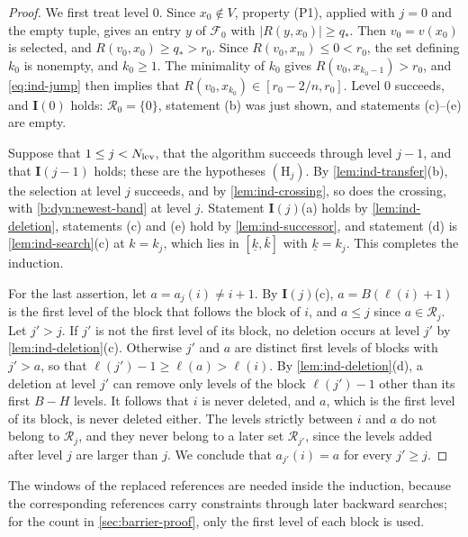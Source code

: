 \begin{proof}
We first treat level $0$. Since $x_0\notin V$, property (P1), applied with $j=0$ and the empty tuple, gives an entry $y$ of $\mathcal F_0$ with $|R(y,x_0)|\ge q_*$. Then $v_0=v(x_0)$ is selected, and $R(v_0,x_0)\ge q_*>r_0$. Since $R(v_0,x_m)\le0<r_0$, the set defining $k_0$ is nonempty, and $k_0\ge1$. The minimality of $k_0$ gives $R(v_0,x_{k_0-1})>r_0$, and \eqref{eq:ind-jump} then implies that $R(v_0,x_{k_0})\in[r_0-2/n,r_0]$. Level $0$ succeeds, and $\mathbf I(0)$ holds: $\mathcal R_0=\{0\}$, statement (b) was just shown, and statements (c)--(e) are empty.

Suppose that $1\le j<N_{\rm lev}$, that the algorithm succeeds through level $j-1$, and that $\mathbf I(j-1)$ holds; these are the hypotheses $(\mathrm H_j)$. By \cref{lem:ind-transfer}(b), the selection at level $j$ succeeds, and by \cref{lem:ind-crossing}, so does the crossing, with \eqref{b:dyn:newest-band} at level $j$. Statement $\mathbf I(j)$(a) holds by \cref{lem:ind-deletion}, statements (c) and (e) hold by \cref{lem:ind-successor}, and statement (d) is \cref{lem:ind-search}(c) at $k=k_j$, which lies in $[\underline k,{\bar k}]$ with $\underline k=k_j$. This completes the induction.

For the last assertion, let $a=a_j(i)\neq i+1$. By $\mathbf I(j)$(c), $a=B({\ell}(i)+1)$ is the first level of the block that follows the block of $i$, and $a\le j$ since $a\in\mathcal R_j$. Let $j'>j$. If $j'$ is not the first level of its block, no deletion occurs at level $j'$ by \cref{lem:ind-deletion}(c). Otherwise $j'$ and $a$ are distinct first levels of blocks with $j'>a$, so that ${\ell}(j')-1\ge {\ell}(a)>{\ell}(i)$. By \cref{lem:ind-deletion}(d), a deletion at level $j'$ can remove only levels of the block ${\ell}(j')-1$ other than its first $B-H$ levels. It follows that $i$ is never deleted, and $a$, which is the first level of its block, is never deleted either. The levels strictly between $i$ and $a$ do not belong to $\mathcal R_j$, and they never belong to a later set $\mathcal R_{j'}$, since the levels added after level $j$ are larger than $j$. We conclude that $a_{j'}(i)=a$ for every $j'\ge j$.
\end{proof}

The windows of the replaced references are needed inside the induction, because the corresponding references carry constraints through later backward searches; for the count in \cref{sec:barrier-proof}, only the first level of each block is used.

